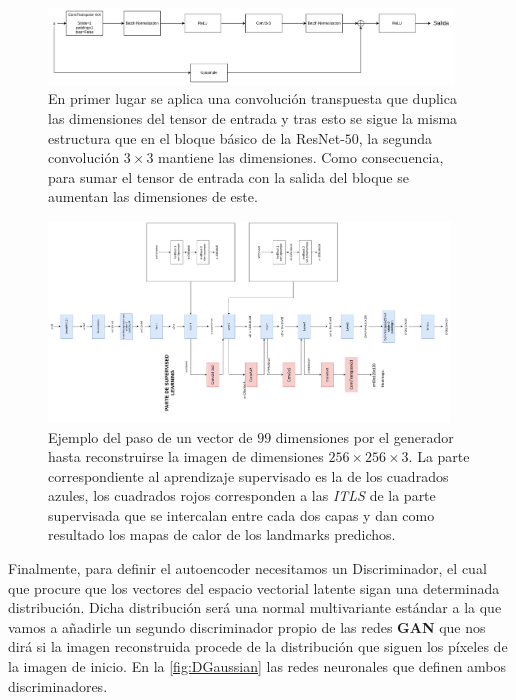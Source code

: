             \begin{figure}[!h]
                \centering
                \includegraphics[width=0.96\textwidth]{img/bloque_invresnet.png}
                \caption{En primer lugar se aplica una convolución transpuesta que duplica las dimensiones del tensor de entrada y tras esto se sigue la misma estructura que en el bloque básico de la ResNet-$50$, la segunda convolución $3\times 3$ mantiene las dimensiones. Como consecuencia, para sumar el tensor de entrada con la salida del bloque se aumentan las dimensiones de este.}
                \label{fig:Bloque_Decoder}
            \end{figure}

            \begin{figure}[!h]
                \centering
                \includegraphics[width=0.95\textwidth,height=0.35\textheight]{img/paso_generator.png}
                \caption{Ejemplo del paso de un vector de $99$ dimensiones por el generador hasta reconstruirse la imagen de dimensiones $256 \times 256 \times 3$. La parte correspondiente al aprendizaje supervisado es la de los cuadrados azules, los cuadrados rojos corresponden a las \textit{ITLS} de la parte supervisada que se intercalan entre cada dos capas y dan como resultado los mapas de calor de los landmarks predichos.}
                \label{fig:Paso_Generator}
            \end{figure}

            \noindent Finalmente, para definir el autoencoder necesitamos un Discriminador, el cual que procure que los vectores del espacio vectorial latente sigan una determinada distribución. Dicha distribución será una normal multivariante estándar a la que vamos a añadirle un segundo discriminador propio de las redes \textbf{GAN} que nos dirá si la imagen reconstruida procede de la distribución que siguen los píxeles de la imagen de inicio. En la \autoref{fig:DGaussian} las redes neuronales que definen ambos discriminadores.

